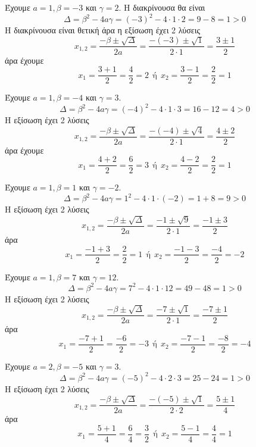 \begin{alist}
\item Έχουμε $ a=1,\beta=-3 $ και $ \gamma=2 $. Η διακρίνουσα θα είναι
\[ \Delta=\beta^2-4a\gamma=(-3)^2-4\cdot 1\cdot 2=9-8=1>0 \]
Η διακρίνουσα είναι θετική άρα η εξίσωση έχει 2 λύσεις
\[ x_{1,2}=\frac{-\beta\pm\sqrt{\Delta}}{2a}=\frac{-(-3)\pm\sqrt{1}}{2\cdot 1}=\frac{3\pm 1}{2} \]
άρα έχουμε
\[ x_1=\frac{3+1}{2}=\frac{4}{2}=2\ \ \text{ή}\ \ x_2=\frac{3-1}{2}=\frac{2}{2}=1 \]
\item Έχουμε $ a=1,\beta=-4 $ και $ \gamma=3 $.
\[ \Delta=\beta^2-4a\gamma=(-4)^2-4\cdot 1\cdot 3=16-12=4>0 \]
Η εξίσωση έχει 2 λύσεις
\[ x_{1,2}=\frac{-\beta\pm\sqrt{\Delta}}{2a}=\frac{-(-4)\pm\sqrt{4}}{2\cdot 1}=\frac{4\pm 2}{2} \]
άρα έχουμε
\[ x_1=\frac{4+2}{2}=\frac{6}{2}=3\ \ \text{ή}\ \ x_2=\frac{4-2}{2}=\frac{2}{2}=1 \]
\item Έχουμε $ a=1,\beta=1 $ και $ \gamma=-2 $.
\[ \Delta=\beta^2-4a\gamma=1^2-4\cdot 1\cdot(-2)=1+8=9>0 \]
Η εξίσωση έχει 2 λύσεις
\[ x_{1,2}=\frac{-\beta\pm\sqrt{\Delta}}{2a}=\frac{-1\pm\sqrt{9}}{2\cdot 1}=\frac{-1\pm 3}{2} \]
άρα
\[ x_1=\frac{-1+3}{2}=\frac{2}{2}=1\ \ \text{ή}\ \ x_2=\frac{-1-3}{2}=\frac{-4}{2}=-2 \]
\item Έχουμε $ a=1,\beta=7 $ και $ \gamma=12 $.
\[ \Delta=\beta^2-4a\gamma=7^2-4\cdot 1\cdot12=49-48=1>0 \]
Η εξίσωση έχει 2 λύσεις
\[ x_{1,2}=\frac{-\beta\pm\sqrt{\Delta}}{2a}=\frac{-7\pm\sqrt{1}}{2\cdot 1}=\frac{-7\pm 1}{2} \]
άρα
\[ x_1=\frac{-7+1}{2}=\frac{-6}{2}=-3\ \ \text{ή}\ \ x_2=\frac{-7-1}{2}=\frac{-8}{2}=-4 \]
\item Έχουμε $ a=2,\beta=-5 $ και $ \gamma=3 $.
\[ \Delta=\beta^2-4a\gamma=(-5)^2-4\cdot 2\cdot 3=25-24=1>0 \]
Η εξίσωση έχει 2 λύσεις
\[ x_{1,2}=\frac{-\beta\pm\sqrt{\Delta}}{2a}=\frac{-(-5)\pm\sqrt{1}}{2\cdot 2}=\frac{5\pm 1}{4} \]
άρα
\[ x_1=\frac{5+1}{4}=\frac{6}{4}=\frac{3}{2}\ \ \text{ή}\ \ x_2=\frac{5-1}{4}=\frac{4}{4}=1 \]
\end{alist}

